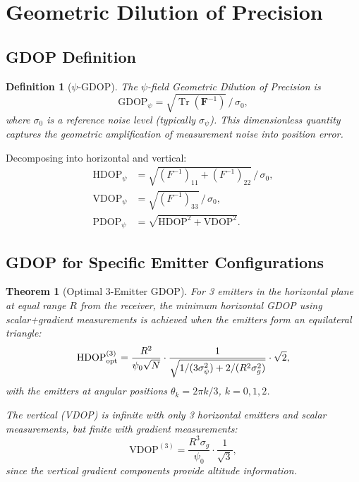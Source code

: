\documentclass[twocolumn,superscriptaddress,prd,nofootinbib]{revtex4-2}
\newcommand{\GDOP}{\mathrm{GDOP}}
\newcommand{\PDOP}{\mathrm{PDOP}}
\newcommand{\HDOP}{\mathrm{HDOP}}
\newcommand{\VDOP}{\mathrm{VDOP}}
\newcommand{\FIM}{\mathbf{F}}
\DeclareMathOperator{\Tr}{Tr}
\newtheorem{theorem}{Theorem}
\newtheorem{definition}{Definition}
\begin{document}
\section{Geometric Dilution of Precision}\label{sec:gdop}

\subsection{GDOP Definition}

\begin{definition}[$\psi$-GDOP]
The $\psi$-field Geometric Dilution of Precision is
\begin{equation}
\GDOP_\psi = \sqrt{\Tr(\FIM^{-1})}\,/\,\sigma_0,
\label{eq:gdop-def}
\end{equation}
where $\sigma_0$ is a reference noise level (typically $\sigma_\psi$).
This dimensionless quantity captures the geometric amplification of
measurement noise into position error.
\end{definition}

Decomposing into horizontal and vertical:
\begin{align}
\HDOP_\psi &= \sqrt{(F^{-1})_{11} + (F^{-1})_{22}}\,/\,\sigma_0, \\
\VDOP_\psi &= \sqrt{(F^{-1})_{33}}\,/\,\sigma_0, \\
\PDOP_\psi &= \sqrt{\HDOP^2 + \VDOP^2}.
\end{align}

\subsection{GDOP for Specific Emitter Configurations}

\begin{theorem}[Optimal 3-Emitter GDOP]\label{thm:3emit}
For 3 emitters in the horizontal plane at equal range $R$ from the
receiver, the minimum horizontal GDOP using scalar+gradient measurements
is achieved when the emitters form an equilateral triangle:
\begin{equation}
\HDOP_{\rm opt}^{(3)} = \frac{R^2}{\psi_0\sqrt{N}}
\cdot\frac{1}{\sqrt{1/(3\sigma_\psi^2) + 2/(R^2\sigma_g^2)}}
\cdot\sqrt{2},
\end{equation}
with the emitters at angular positions
$\theta_k = 2\pi k/3$, $k = 0,1,2$.

The vertical (VDOP) is infinite with only 3 horizontal emitters and
scalar measurements, but finite with gradient measurements:
\begin{equation}
\VDOP^{(3)} = \frac{R^3\sigma_g}{\psi_0}\cdot\frac{1}{\sqrt{3}},
\end{equation}
since the vertical gradient components provide altitude information.
\end{theorem}
\end{document}
